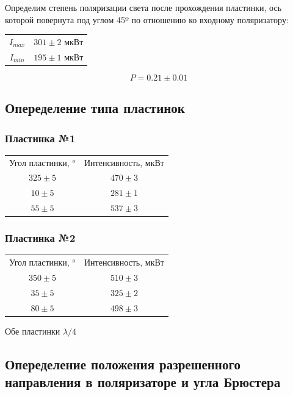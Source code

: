 \documentclass[a4paper, 12pt]{article}
\begin{document}
Определим степень поляризации света после прохождения пластинки, ось которой повернута под углом 45º по отношению ко входному поляризатору:

\begin{center}
\begin{tabular}{ c c }
$I_{max} $ &$301\pm2$ мкВт\\
$I_{min}$ & $195\pm1$ мкВт\\
\end{tabular}
\end{center}

\[P =0.21 \pm0.01 \]



		\subsection{Опеределение типа пластинок}

			\subsubsection{Пластинка №1}
\begin{center}
\begin{tabular}{ c c }
Угол пластинки, $^o$ & Интенсивность, мкВт\\
$325\pm 5 $&$470\pm3$\\
$10\pm 5 $& $281\pm1$\\
$55\pm 5$ & $537\pm3$\\
\end{tabular}
\end{center}


			\subsubsection{Пластинка №2}
\begin{center}
\begin{tabular}{ c c }
Угол пластинки, $^o$ & Интенсивность, мкВт\\
$350\pm 5 $&$510\pm3$\\
$35\pm 5 $& $325\pm2$\\
$80\pm 5$ &$498\pm3$\\
\end{tabular}
\end{center}

Обе пластинки  $\lambda/4$


		\subsection{Опеределение положения разрешенного направления в поляризаторе и угла Брюстера}
\end{document}
